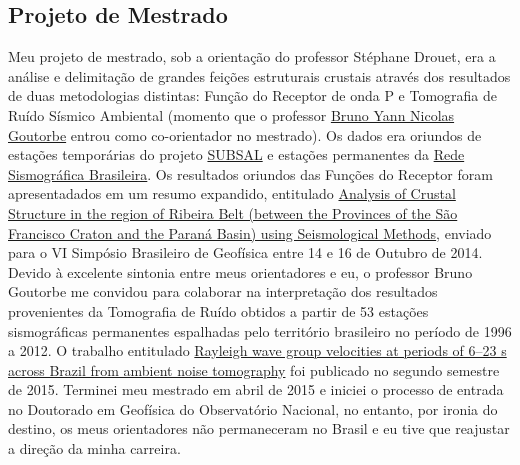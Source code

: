 \documentclass[10pt,a4paper,oneside]{book}
\begin{document}
\subsection{Projeto de Mestrado}
\label{sec_proj_mest}

Meu projeto de mestrado, sob a orientação do professor Stéphane Drouet, era a análise e delimitação de grandes feições estruturais crustais através dos resultados de duas metodologias distintas: Função do Receptor de onda P e Tomografia de Ruído Sísmico Ambiental (momento que o professor \href{http://lattes.cnpq.br/5754348793953158}{Bruno Yann Nicolas Goutorbe} entrou como co-orientador no mestrado). Os dados era oriundos de estações temporárias do projeto \href{http://www.pegbr.on.br:8080/pegbr/visualizar/SolicitacaoDadosProjeto.jsp?cod=74}{SUBSAL} e estações permanentes da \href{www.rsbr.on.br}{Rede Sismográfica Brasileira}. Os resultados oriundos das Funções do Receptor foram apresentadados em um resumo expandido, entitulado \href{http://dx.doi.org/10.22564/6simbgf2014.043}{Analysis of Crustal Structure in the region of Ribeira Belt (between the Provinces of the São Francisco Craton and the Paraná Basin) using Seismological Methods}, enviado para o VI Simpósio Brasileiro de Geofísica entre 14 e 16 de Outubro de 2014. Devido à excelente sintonia entre meus orientadores e eu, o professor Bruno Goutorbe me convidou para colaborar na interpretação dos resultados provenientes da Tomografia de Ruído obtidos a partir de 53 estações sismográficas permanentes espalhadas pelo território brasileiro no período de 1996 a 2012. O trabalho entitulado \href{http://dx.doi.org/10.1093/gji/ggv343}{Rayleigh wave group velocities at periods of 6–23 s across Brazil from ambient noise tomography} foi publicado no segundo semestre de 2015. Terminei meu mestrado em abril de 2015 e iniciei o processo de entrada no Doutorado em Geofísica do Observatório Nacional, no entanto, por ironia do destino, os meus orientadores não permaneceram no Brasil e eu tive que reajustar a direção da minha carreira.

\bigskip
\end{document}
